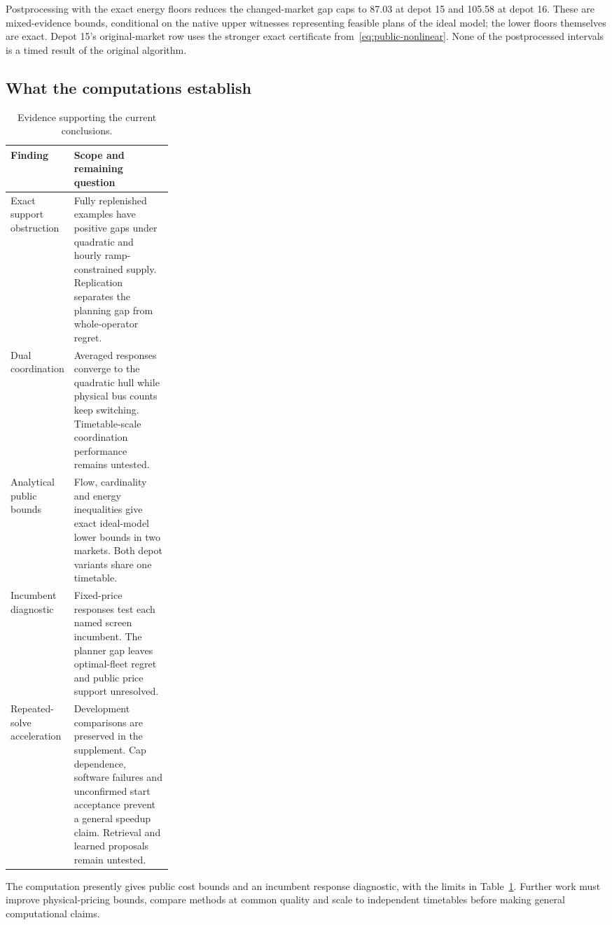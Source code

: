 Postprocessing with the exact energy floors reduces the changed-market gap
caps to 87.03 at depot 15 and 105.58 at depot 16. These are mixed-evidence bounds,
conditional on the native upper witnesses representing feasible plans of the
ideal model; the lower floors themselves are exact. Depot 15's original-market
row uses the stronger exact certificate from~\eqref{eq:public-nonlinear}.
None of the postprocessed intervals is a timed result of the original algorithm.

\subsection{What the computations establish}

\begin{table}[htbp]
\centering\small
\caption{Evidence supporting the current conclusions.}\label{tab:evidence-map}
\begin{tabularx}{\linewidth}{>{\raggedright\arraybackslash}p{0.27\linewidth}X}
\toprule
Finding & Scope and remaining question\\
\midrule
Exact support obstruction & Fully replenished examples have positive gaps under
quadratic and hourly ramp-constrained supply. Replication separates the
planning gap from whole-operator regret.\\
Dual coordination & Averaged responses converge to the quadratic hull while
physical bus counts keep switching. Timetable-scale coordination performance
remains untested.\\
Analytical public bounds & Flow, cardinality and energy inequalities give exact
ideal-model lower bounds in two markets. Both depot variants share one timetable.\\
Incumbent diagnostic & Fixed-price responses test each named screen incumbent.
The planner gap leaves optimal-fleet regret and public price support unresolved.\\
Repeated-solve acceleration & Development comparisons are preserved in the
supplement. Cap dependence, software failures and unconfirmed start acceptance
prevent a general speedup claim. Retrieval and learned proposals remain untested.\\
\bottomrule
\end{tabularx}
\end{table}

The computation presently gives public cost bounds and an incumbent response
diagnostic, with the limits in Table~\ref{tab:evidence-map}. Further work
must improve physical-pricing bounds, compare methods at common quality and
scale to independent timetables before making general computational claims.
